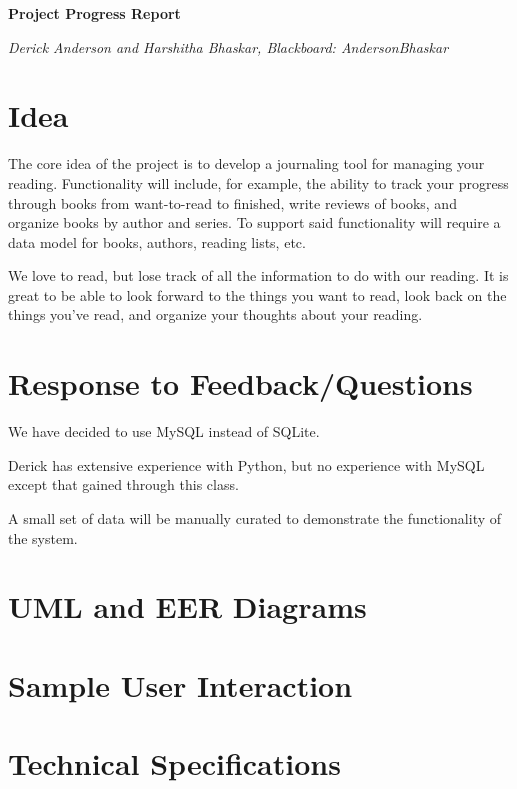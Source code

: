 \documentclass{article}
\begin{document}

\begin{center}
  \textbf{Project Progress Report}

  \textit{Derick Anderson and Harshitha Bhaskar, Blackboard: AndersonBhaskar}
\end{center}

\section*{Idea}

The core idea of the project is to develop a journaling tool for managing your
reading. Functionality will include, for example, the ability to track your
progress through books from want-to-read to finished, write reviews of books,
and organize books by author and series. To support said functionality will
require a data model for books, authors, reading lists, etc.

We love to read, but lose track of all the information to do with our
reading. It is great to be able to look forward to the things you want to read,
look back on the things you’ve read, and organize your thoughts about your
reading.

\section*{Response to Feedback/Questions}

We have decided to use MySQL instead of SQLite.

Derick has extensive experience with Python,
but no experience with MySQL
except that gained through this class.

A small set of data will be manually curated to demonstrate the functionality of
the system.

\section*{UML and EER Diagrams}

\section*{Sample User Interaction}


\section*{Technical Specifications}
\end{document}
